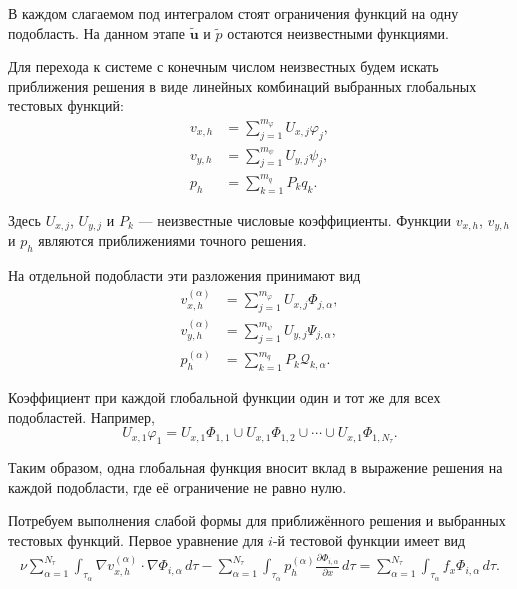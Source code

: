 \documentclass[a4paper,14pt]{extarticle}
\begin{document}
	В каждом слагаемом под интегралом стоят ограничения функций на одну
	подобласть. На данном этапе $\widetilde{\boldsymbol u}$ и
	$\widetilde p$ остаются неизвестными функциями.
	
	\medskip
	
	Для перехода к системе с конечным числом неизвестных будем искать
	приближения решения в виде линейных комбинаций выбранных глобальных
	тестовых функций:
	\[
	\begin{aligned}
		v_{x,h}
		&=
		\sum_{j=1}^{m_\varphi}U_{x,j}\varphi_j,
		\\
		v_{y,h}
		&=
		\sum_{j=1}^{m_\psi}U_{y,j}\psi_j,
		\\
		p_h
		&=
		\sum_{k=1}^{m_q}P_kq_k.
	\end{aligned}
	\]
	
	Здесь $U_{x,j}$, $U_{y,j}$ и $P_k$ --- неизвестные числовые
	коэффициенты. Функции $v_{x,h}$, $v_{y,h}$ и $p_h$ являются
	приближениями точного решения.
	
	На отдельной подобласти эти разложения принимают вид
	\[
	\begin{aligned}
		v_{x,h}^{(\alpha)}
		&=
		\sum_{j=1}^{m_\varphi}
		U_{x,j}\Phi_{j,\alpha},
		\\
		v_{y,h}^{(\alpha)}
		&=
		\sum_{j=1}^{m_\psi}
		U_{y,j}\Psi_{j,\alpha},
		\\
		p_h^{(\alpha)}
		&=
		\sum_{k=1}^{m_q}
		P_k\mathcal Q_{k,\alpha}.
	\end{aligned}
	\]
	
	Коэффициент при каждой глобальной функции один и тот же для всех
	подобластей. Например,
	\[
	U_{x,1}\varphi_1
	=
	U_{x,1}\Phi_{1,1}
	\cup
	U_{x,1}\Phi_{1,2}
	\cup\cdots\cup
	U_{x,1}\Phi_{1,N_\tau}.
	\]
	
	Таким образом, одна глобальная функция вносит вклад в выражение
	решения на каждой подобласти, где её ограничение не равно нулю.
	
	\medskip
	
	Потребуем выполнения слабой формы для приближённого решения и
	выбранных тестовых функций. Первое уравнение для $i$-й тестовой
	функции имеет вид
	\[
	\begin{aligned}
		\nu\sum_{\alpha=1}^{N_\tau}
		\int_{\tau_\alpha}
		\nabla v_{x,h}^{(\alpha)}
		\cdot\nabla\Phi_{i,\alpha}\,d\tau
		-
		\sum_{\alpha=1}^{N_\tau}
		\int_{\tau_\alpha}
		p_h^{(\alpha)}
		\frac{\partial\Phi_{i,\alpha}}{\partial x}\,d\tau
		=
		\sum_{\alpha=1}^{N_\tau}
		\int_{\tau_\alpha}
		f_x\Phi_{i,\alpha}\,d\tau.
	\end{aligned}
	\]
	
\end{document}
